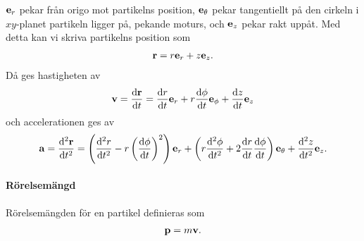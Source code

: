 $\vect{e}_{r}$ pekar från origo mot partikelns position, $\vect{e}_{\theta}$ pekar tangentiellt på den cirkeln i $xy$-planet partikeln ligger på, pekande moturs, och $\vect{e}_{z}$ pekar rakt uppåt. Med detta kan vi skriva partikelns position som
\begin{align*}
	\vect{r} = r\vect{e}_{r} + z\vect{e}_{z}.
\end{align*}
Då ges hastigheten av
\begin{align*}
	\vect{v} = \dv{\vect{r}}{t} = \dv{r}{t}\vect{e}_{r} + r\dv{\phi}{t}\vect{e}_{\phi} + \dv{z}{t}\vect{e}_{z}
\end{align*}
och accelerationen ges av
\begin{align*}
	\vect{a} = \dv[2]{\vect{r}}{t} = \left(\dv[2]{r}{t} - r\left(\dv{\phi}{t}\right)^2\right)\vect{e}_{r} + \left(r\dv[2]{\phi}{t} + 2\dv{r}{t}\dv{\phi}{t}\right)\vect{e}_{\theta} + \dv[2]{z}{t}\vect{e}_{z}.
\end{align*}

\paragraph{Rörelsemängd}
Rörelsemängden för en partikel definieras som
\begin{align*}
	\vect{p} = m\vect{v}.
\end{align*}
